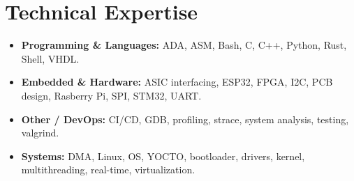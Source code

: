 \documentclass[9pt,a4paper]{article}
\begin{document}
\section*{Technical Expertise}
\begin{tcolorbox}[mybox]
\begin{itemize}
\item \textbf{Programming \& Languages:} ADA, ASM, Bash, C, C++, Python, Rust, Shell, VHDL.

\item \textbf{Embedded \& Hardware:} ASIC interfacing, ESP32, FPGA, I2C, PCB design, Rasberry Pi, SPI, STM32, UART.

\item \textbf{Other / DevOps:} CI/CD, GDB, profiling, strace, system analysis, testing, valgrind.

\item \textbf{Systems:} DMA, Linux, OS, YOCTO, bootloader, drivers, kernel, multithreading, real-time, virtualization.
\end{itemize}
\end{tcolorbox}
\end{document}
